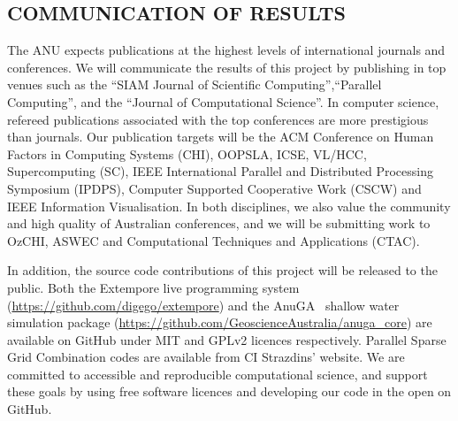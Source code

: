 \subsection*{COMMUNICATION OF RESULTS}

The ANU expects publications at the highest levels of international
journals and conferences. We will communicate the results of this
project by publishing in top venues such as the ``SIAM Journal of
Scientific Computing'',``Parallel Computing'', and the ``Journal of
Computational Science''. In computer science, refereed publications
associated with the top conferences are more prestigious than
journals. Our publication targets will be the ACM Conference on Human
Factors in Computing Systems (CHI), OOPSLA, ICSE, VL/HCC,
Supercomputing (SC), IEEE International Parallel and Distributed
Processing Symposium (IPDPS), Computer Supported Cooperative Work
(CSCW) and IEEE Information Visualisation. In both disciplines, we
also value the community and high quality of Australian conferences,
and we will be submitting work to OzCHI, ASWEC and Computational
Techniques and Applications (CTAC).


In addition, the source code contributions of this project will be
released to the public. Both the Extempore live programming system
(\url{https://github.com/digego/extempore}) and the
 AnuGA~\parencite{anugamanual,nielsen2005hydrodynamic} 
shallow
water simulation package
(\url{https://github.com/GeoscienceAustralia/anuga_core}) are
available on GitHub under MIT and GPLv2 licences respectively.
Parallel Sparse Grid Combination codes are available from CI
Strazdins' website.  We are committed to accessible and reproducible
computational science, and support these goals by using free software
licences and developing our code in the open on GitHub.

